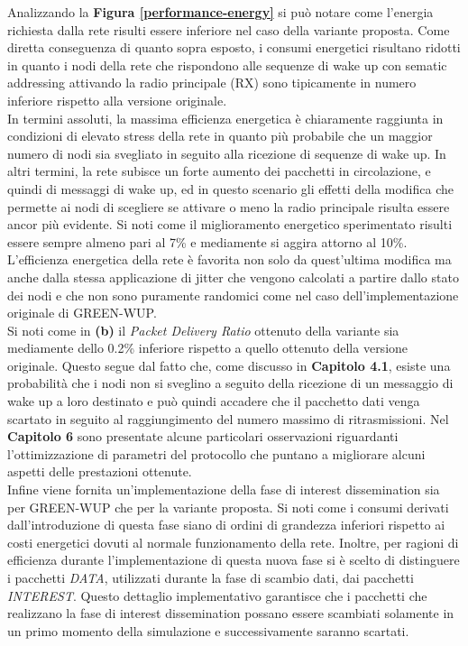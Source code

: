 \documentclass[binding=0.6cm,TFA]{sapthesis}
\begin{document}
Analizzando la \textbf{Figura \ref{performance-energy}} si può notare come l'energia richiesta dalla rete risulti essere inferiore nel caso della variante
proposta. Come diretta conseguenza di quanto sopra esposto, i consumi energetici risultano ridotti in quanto i nodi della rete che rispondono alle sequenze
di wake up con sematic addressing attivando la radio principale (RX) sono tipicamente in numero inferiore rispetto alla versione originale.\\

In termini assoluti, la massima efficienza energetica è chiaramente raggiunta in condizioni di elevato stress della rete in quanto più probabile
che un maggior numero di nodi sia svegliato in seguito alla ricezione di sequenze di wake up. In altri termini, la rete subisce un forte aumento
dei pacchetti in circolazione, e quindi di messaggi di wake up, ed in questo scenario gli effetti della modifica che permette ai nodi di
scegliere se attivare o meno la radio principale risulta essere ancor più evidente. Si noti come il miglioramento energetico sperimentato
risulti essere sempre almeno pari al 7\% e mediamente si aggira attorno al 10\%.\\


L'efficienza energetica della rete è favorita non solo da quest'ultima modifica ma anche dalla stessa applicazione di jitter che vengono
calcolati a partire dallo stato dei nodi e che non sono puramente randomici come nel caso dell'implementazione originale di GREEN-WUP.\\

Si noti come in \textbf{(b)} il \emph{Packet Delivery Ratio} ottenuto della variante sia mediamente dello 0.2\% inferiore rispetto a quello ottenuto
della versione originale. Questo segue dal fatto che, come discusso in \textbf{Capitolo 4.1}, esiste una probabilità che i nodi non si
sveglino a seguito della ricezione di un messaggio di wake up a loro destinato e può quindi accadere che il pacchetto dati venga scartato in seguito
al raggiungimento del numero massimo di ritrasmissioni. Nel \textbf{Capitolo 6} sono presentate alcune particolari osservazioni riguardanti
l'ottimizzazione di parametri del protocollo che puntano a migliorare alcuni aspetti delle prestazioni ottenute.\\

Infine viene fornita un'implementazione della fase di interest dissemination sia per GREEN-WUP che per la variante proposta. Si noti come i consumi
derivati dall'introduzione di questa fase siano di ordini di grandezza inferiori rispetto ai costi energetici dovuti al normale funzionamento della rete.
Inoltre, per ragioni di efficienza durante l'implementazione di questa nuova fase si è scelto di distinguere i pacchetti \emph{DATA}, utilizzati
durante la fase di scambio dati, dai pacchetti \emph{INTEREST}. Questo dettaglio implementativo garantisce che i pacchetti che realizzano la
fase di interest dissemination possano essere scambiati solamente in un primo momento della simulazione e successivamente saranno scartati.\\
\end{document}
